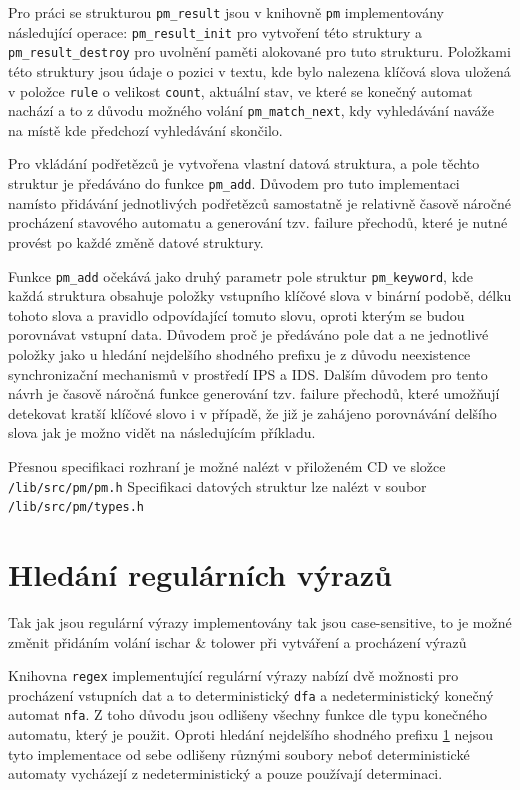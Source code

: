 Pro práci se strukturou \texttt{pm\_result} jsou v knihovně \texttt{pm} implementovány následující operace:
\texttt{pm\_result\_init} pro vytvoření této struktury a \texttt{pm\_result\_destroy} pro
uvolnění paměti alokované pro tuto strukturu. Položkami této struktury jsou údaje o pozici v textu,
kde bylo nalezena klíčová slova uložená v položce \texttt{rule} o velikost \texttt{count},
aktuální stav, ve které se konečný automat nachází a to z důvodu možného volání
\texttt{pm\_match\_next}, kdy vyhledávání naváže na místě kde předchozí vyhledávání skončilo.

Pro vkládání podřetězců je vytvořena vlastní datová struktura, a pole těchto struktur je předáváno do funkce
\texttt{pm\_add}. Důvodem pro tuto implementaci namísto přidávání jednotlivých podřetězců samostatně
je relativně časově náročné procházení stavového automatu a generování tzv. failure přechodů,
které je nutné provést po každé změně datové struktury.

Funkce \texttt{pm\_add} očekává jako druhý parametr pole struktur \texttt{pm\_keyword}, kde každá struktura
obsahuje položky vstupního klíčové slova v binární podobě, délku tohoto slova a pravidlo odpovídající tomuto slovu, oproti kterým se budou porovnávat vstupní data. Důvodem proč je předáváno pole dat a ne jednotlivé položky
jako u hledání nejdelšího shodného prefixu je z důvodu neexistence synchronizační mechanismů
v prostředí IPS a IDS. Dalším důvodem pro tento návrh je časově náročná funkce generování
tzv. failure přechodů, které umožňují detekovat kratší klíčové slovo i v případě, že již je
zahájeno porovnávání delšího slova jak je možno vidět na následujícím příkladu.

Přesnou specifikaci rozhraní je možné nalézt v přiloženém CD ve složce \texttt{/lib/src/pm/pm.h}
Specifikaci datových struktur lze nalézt v soubor \texttt{/lib/src/pm/types.h}

\section{Hledání regulárních výrazů}  %
Tak jak jsou regulární výrazy implementovány tak jsou case-sensitive, to je možné změnit
přidáním volání ischar \& tolower při vytváření a procházení výrazů

Knihovna \texttt{regex} implementující regulární výrazy nabízí dvě možnosti pro procházení
vstupních dat a to deterministický \texttt{dfa} a nedeterministický konečný automat \texttt{nfa}.
Z toho důvodu jsou odlišeny všechny funkce dle typu konečného automatu, který je použit.
Oproti hledání nejdelšího shodného prefixu \ref{} nejsou tyto implementace od sebe odlišeny
různými soubory neboť deterministické automaty vycházejí z nedeterministický a pouze používají
determinaci.


